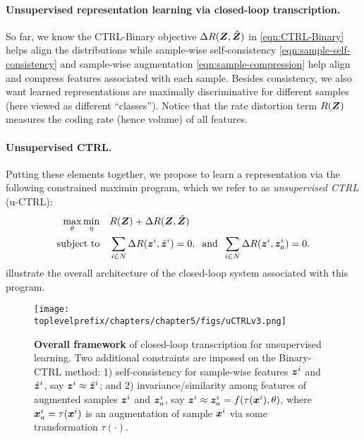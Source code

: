 \documentclass[../../book-main.tex]{subfiles}
\begin{document}
\paragraph{Unsupervised representation learning via closed-loop transcription.} 
So far, we know the CTRL-Binary objective $\Delta R(\bm{Z}, \hat{\bm{Z}})$ in \eqref{eqn:CTRL-Binary} helps align the distributions while sample-wise self-consistency \eqref{eqn:sample-self-consistency} and sample-wise augmentation \eqref{eqn:sample-compression} help align and compress features associated with each sample. Besides consistency, we also want learned representations are maximally discriminative for different samples (here viewed as different ``classes''). Notice that the rate distortion term $R(\bm{Z})$ measures the coding rate (hence volume) of all features. %

\paragraph{Unsupervised CTRL.} Putting these elements together, we propose to learn a representation via the following constrained maximin program, which we refer to as {\em unsupervised CTRL} (u-CTRL):
\begin{align}
      \max_\theta \min_\eta  \quad & R(\bm{Z}) + \Delta R(\bm{Z}, \hat{\bm{Z}}) \label{eqn:constrained_maxmin}\\
 \mbox{subject to} \quad & \sum_{i\in N} \Delta R(\bm{z}^i, \hat{\bm{z}}^i) = 0, \;\; \mbox{and} \;\; \sum_{i\in N} \Delta R(\bm{z}^i, \bm{z}_{a}^i) = 0. \nonumber
\end{align}
 illustrate the overall architecture of the closed-loop system associated with this program.
\begin{figure}[t]
\centering
\texttt{[image: \\toplevelprefix/chapters/chapter5/figs/uCTRLv3.png]}
\caption{\textbf{Overall framework} of closed-loop transcription for unsupervised learning. Two additional constraints are imposed on the Binary-CTRL method: 1) self-consistency for sample-wise features $\bm{z}^i$ and $\hat{\bm{z}}^i$, say $\bm{z}^i \approx \hat{\bm{z}}^i$; and 2) invariance/similarity among features of augmented samples $\bm{z}^i$ and $\bm{z}_{a}^i$, say $\bm{z}^i \approx \bm{z}_{a}^i=f(\tau(\bm{x}^i), \theta)$, where $\bm{x}^i_a=\tau(\bm{x}^i)$ is an augmentation of sample $\bm{x}^i$ via some transformation $\tau(\cdot)$.}
\label{fig:framework-uCTRL}
\end{figure}
\end{document}
